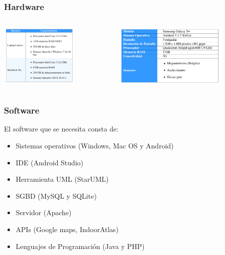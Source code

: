 \documentclass[12pt]{beamer}
\begin{document}
\begin{frame}
	\frametitle{Hardware}
	\begin{columns} 
		\begin{column}{2cm}
			\begin{center}
				\includegraphics[height=3cm]{imagenes/computadoras.png}
			\end{center}
		\end{column}
		\begin{column}{5cm} 
			\begin{center}
				\includegraphics[height=3cm]{imagenes/telefono.png}
			\end{center} 
		\end{column} 
	\end{columns}
\end{frame}


\begin{frame}
	\frametitle{Software}
		El software que se necesita consta de: 
		\begin{itemize}
		 	\item Sistemas operativos (Windows, Mac OS y Android)
		 	\item IDE (Android Studio)
		 	\item Herramienta UML (StarUML)
		 	\item SGBD (MySQL y SQLite)
		 	\item Servidor (Apache)
		 	\item APIs (Google maps, IndoorAtlas)
		 	\item Lenguajes de Programación (Java y PHP)		 	
		\end{itemize}
\end{frame}
\end{document}
